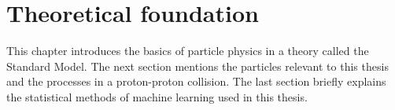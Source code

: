 \chapter{Theoretical foundation}

This chapter introduces the basics of particle physics in a theory called the Standard Model.
The next section mentions the particles relevant to this thesis and the processes in a proton-proton collision.
The last section briefly explains the statistical methods of machine learning used in this thesis.




